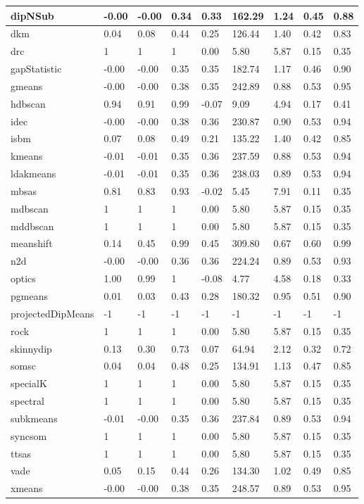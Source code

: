 \begin{table}[H]
\begin{tabular}{|l|l|l|l|l|l|l|l|l|}
\hline
dipNSub & -0.00 & -0.00 & 0.34 & 0.33 & 162.29 & 1.24 & 0.45 & 0.88 \\
\hline
dkm & 0.04 & 0.08 & 0.44 & 0.25 & 126.44 & 1.40 & 0.42 & 0.83 \\
\hline
drc & 1 & 1 & 1 & 0.00 & 5.80 & 5.87 & 0.15 & 0.35 \\
\hline
gapStatistic & -0.00 & -0.00 & 0.35 & 0.35 & 182.74 & 1.17 & 0.46 & 0.90 \\
\hline
gmeans & -0.00 & -0.00 & 0.38 & 0.35 & 242.89 & 0.88 & 0.53 & 0.95 \\
\hline
hdbscan & 0.94 & 0.91 & 0.99 & -0.07 & 9.09 & 4.94 & 0.17 & 0.41 \\
\hline
idec & -0.00 & -0.00 & 0.38 & 0.36 & 230.87 & 0.90 & 0.53 & 0.94 \\
\hline
isbm & 0.07 & 0.08 & 0.49 & 0.21 & 135.22 & 1.40 & 0.42 & 0.85 \\
\hline
kmeans & -0.01 & -0.01 & 0.35 & 0.36 & 237.59 & 0.88 & 0.53 & 0.94 \\
\hline
ldakmeans & -0.01 & -0.01 & 0.35 & 0.36 & 238.03 & 0.89 & 0.53 & 0.94 \\
\hline
mbsas & 0.81 & 0.83 & 0.93 & -0.02 & 5.45 & 7.91 & 0.11 & 0.35 \\
\hline
mdbscan & 1 & 1 & 1 & 0.00 & 5.80 & 5.87 & 0.15 & 0.35 \\
\hline
mddbscan & 1 & 1 & 1 & 0.00 & 5.80 & 5.87 & 0.15 & 0.35 \\
\hline
meanshift & 0.14 & 0.45 & 0.99 & 0.45 & 309.80 & 0.67 & 0.60 & 0.99 \\
\hline
n2d & -0.00 & -0.00 & 0.36 & 0.36 & 224.24 & 0.89 & 0.53 & 0.93 \\
\hline
optics & 1.00 & 0.99 & 1 & -0.08 & 4.77 & 4.58 & 0.18 & 0.33 \\
\hline
pgmeans & 0.01 & 0.03 & 0.43 & 0.28 & 180.32 & 0.95 & 0.51 & 0.90 \\
\hline
projectedDipMeans & -1 & -1 & -1 & -1 & -1 & -1 & -1 & -1 \\
\hline
rock & 1 & 1 & 1 & 0.00 & 5.80 & 5.87 & 0.15 & 0.35 \\
\hline
skinnydip & 0.13 & 0.30 & 0.73 & 0.07 & 64.94 & 2.12 & 0.32 & 0.72 \\
\hline
somsc & 0.04 & 0.04 & 0.48 & 0.25 & 134.91 & 1.13 & 0.47 & 0.85 \\
\hline
specialK & 1 & 1 & 1 & 0.00 & 5.80 & 5.87 & 0.15 & 0.35 \\
\hline
spectral & 1 & 1 & 1 & 0.00 & 5.80 & 5.87 & 0.15 & 0.35 \\
\hline
subkmeans & -0.01 & -0.00 & 0.35 & 0.36 & 237.84 & 0.89 & 0.53 & 0.94 \\
\hline
syncsom & 1 & 1 & 1 & 0.00 & 5.80 & 5.87 & 0.15 & 0.35 \\
\hline
ttsas & 1 & 1 & 1 & 0.00 & 5.80 & 5.87 & 0.15 & 0.35 \\
\hline
vade & 0.05 & 0.15 & 0.44 & 0.26 & 134.30 & 1.02 & 0.49 & 0.85 \\
\hline
xmeans & -0.00 & -0.00 & 0.38 & 0.35 & 248.57 & 0.89 & 0.53 & 0.95 \\
\hline
\end{tabular}
\end{table}